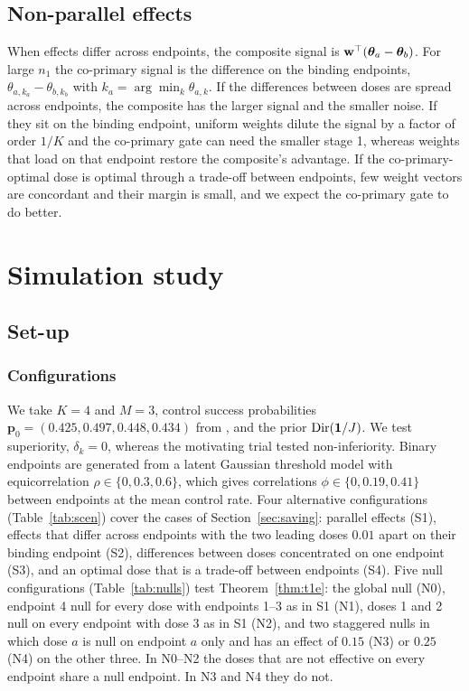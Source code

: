 \subsection{Non-parallel effects}
When effects differ across endpoints, the composite signal is $\mathbf{w}^\top(\bm\theta_a-\bm\theta_b)$. For large $n_1$ the co-primary signal is the difference on the binding endpoints, $\theta_{a,k_a}-\theta_{b,k_b}$ with $k_a=\arg\min_k\theta_{a,k}$. If the differences between doses are spread across endpoints, the composite has the larger signal and the smaller noise. If they sit on the binding endpoint, uniform weights dilute the signal by a factor of order $1/K$ and the co-primary gate can need the smaller stage 1, whereas weights that load on that endpoint restore the composite's advantage. If the co-primary-optimal dose is optimal through a trade-off between endpoints, few weight vectors are concordant and their margin is small, and we expect the co-primary gate to do better.

\section{Simulation study}\label{sec:sim}

\subsection{Set-up}\label{sec:setup}

\subsubsection{Configurations}
We take $K=4$ and $M=3$, control success probabilities $\mathbf p_0=(0.425,0.497,0.448,0.434)$ from \citet{yang2024}, and the prior $\mathrm{Dir}(\mathbf 1/J)$. We test superiority, $\delta_k=0$, whereas the motivating trial tested non-inferiority. Binary endpoints are generated from a latent Gaussian threshold model with equicorrelation $\rho\in\{0,0.3,0.6\}$, which gives correlations $\phi\in\{0,0.19,0.41\}$ between endpoints at the mean control rate. Four alternative configurations (Table~\ref{tab:scen}) cover the cases of Section~\ref{sec:saving}: parallel effects (S1), effects that differ across endpoints with the two leading doses $0.01$ apart on their binding endpoint (S2), differences between doses concentrated on one endpoint (S3), and an optimal dose that is a trade-off between endpoints (S4). Five null configurations (Table~\ref{tab:nulls}) test Theorem~\ref{thm:t1e}: the global null (N0), endpoint 4 null for every dose with endpoints 1--3 as in S1 (N1), doses 1 and 2 null on every endpoint with dose 3 as in S1 (N2), and two staggered nulls in which dose $a$ is null on endpoint $a$ only and has an effect of $0.15$ (N3) or $0.25$ (N4) on the other three. In N0--N2 the doses that are not effective on every endpoint share a null endpoint. In N3 and N4 they do not.

